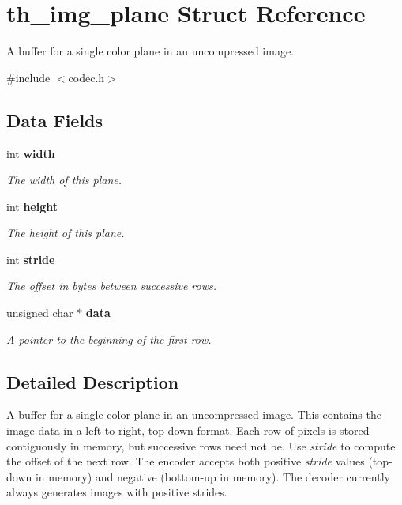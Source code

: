 \section{th\_\-img\_\-plane Struct Reference}
\label{structth__img__plane}


A buffer for a single color plane in an uncompressed image.  




{\ttfamily \#include $<$codec.h$>$}

\subsection*{Data Fields}
\begin{DoxyCompactItemize}
\item 
int {\bf width}
\begin{DoxyCompactList}\small\item\em The width of this plane. \item\end{DoxyCompactList}\item 
int {\bf height}
\begin{DoxyCompactList}\small\item\em The height of this plane. \item\end{DoxyCompactList}\item 
int {\bf stride}
\begin{DoxyCompactList}\small\item\em The offset in bytes between successive rows. \item\end{DoxyCompactList}\item 
unsigned char $\ast$ {\bf data}
\begin{DoxyCompactList}\small\item\em A pointer to the beginning of the first row. \item\end{DoxyCompactList}\end{DoxyCompactItemize}


\subsection{Detailed Description}
A buffer for a single color plane in an uncompressed image. This contains the image data in a left-\/to-\/right, top-\/down format. Each row of pixels is stored contiguously in memory, but successive rows need not be. Use {\itshape stride\/} to compute the offset of the next row. The encoder accepts both positive {\itshape stride\/} values (top-\/down in memory) and negative (bottom-\/up in memory). The decoder currently always generates images with positive strides. 

